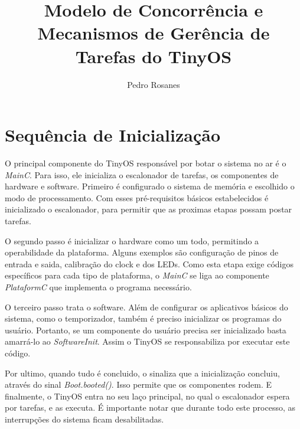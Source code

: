 \documentclass[a4paper,onecolumn, 10pt]{article}
\title{Modelo de Concorrência e Mecanismos de Gerência de Tarefas do TinyOS}
\author{Pedro Rosanes}
\begin{document}
\maketitle





\section{Sequência de Inicialização}\label{sequenciadeinicializacoes}
O principal componente do TinyOS responsável por botar o sistema no ar é o \textit{MainC}. Para isso, ele inicializa o escalonador de tarefas, os componentes de hardware e software. Primeiro é configurado o sistema de memória e escolhido o modo de processamento. Com esses pré-requisitos básicos estabelecidos é inicializado o escalonador, para permitir que as proximas etapas possam postar tarefas.

O segundo passo é inicializar o hardware como um todo, permitindo a operabilidade da plataforma. Alguns exemplos são configuração de pinos de entrada e saida, calibração do clock e dos LEDs. Como esta etapa exige códigos específicos para cada tipo de plataforma, o \textit{MainC} se liga ao componente \textit{PlataformC} que implementa o programa necessário.

O terceiro passo trata o software. Além de configurar os aplicativos básicos do sistema, como o temporizador, também é preciso inicializar os programas do usuário. Portanto, se um componente do usuário precisa ser inicializado basta amarrá-lo ao \textit{SoftwareInit}. Assim o TinyOS se responsabiliza por executar este código.

Por ultimo, quando tudo é concluido, o  sinaliza que a inicialização concluiu, através do sinal \textit{Boot.booted()}. Isso permite que os componentes rodem. E finalmente, o TinyOS entra no seu laço principal, no qual o escalonador espera por tarefas, e as executa. É importante notar que durante todo este processo, as interrupções do sistema ficam desabilitadas.
\end{document}
